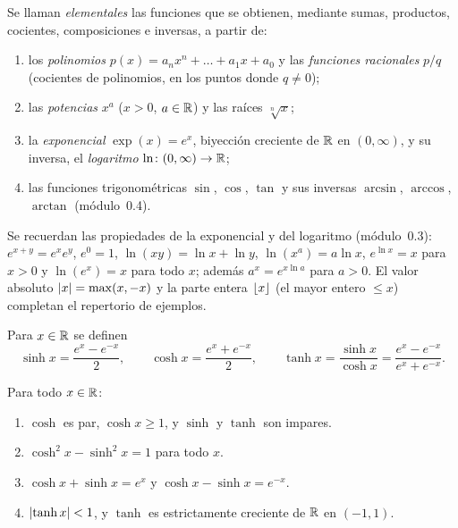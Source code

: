 \begin{definicion}\label{def:elementales}
Se llaman \emph{elementales} las funciones que se obtienen, mediante sumas, productos, cocientes, composiciones e inversas, a partir de:
\begin{enumerate}
  \item los \emph{polinomios} $p(x)=a_nx^{n}+\dots+a_1x+a_0$ y las \emph{funciones racionales} $p/q$ (cocientes de polinomios, en los puntos donde $q\ne0$);
  \item las \emph{potencias} $x^{a}$ ($x>0$, $a\in\mathbb{R}$) y las raíces $\sqrt[n]{x}$;
  \item la \emph{exponencial} $\exp(x)=e^{x}$, biyección creciente de $\mathbb{R}$ en $(0,\infty)$, y su inversa, el \emph{logaritmo} $\ln\colon(0,\infty)\to\mathbb{R}$;
  \item las funciones trigonométricas $\sin$, $\cos$, $\tan$ y sus inversas $\arcsin$, $\arccos$, $\arctan$ (módulo~0.4).
\end{enumerate}
\end{definicion}

Se recuerdan las propiedades de la exponencial y del logaritmo (módulo~0.3): $e^{x+y}=e^{x}e^{y}$, $e^{0}=1$, $\ln(xy)=\ln x+\ln y$, $\ln(x^{a})=a\ln x$, $e^{\ln x}=x$ para $x>0$ y $\ln(e^{x})=x$ para todo $x$; además $a^{x}=e^{x\ln a}$ para $a>0$. El valor absoluto $\lvert x\rvert=\max(x,-x)$ y la parte entera $\lfloor x\rfloor$ (el mayor entero $\le x$) completan el repertorio de ejemplos.

\begin{definicion}\label{def:hiperbolicas}
Para $x\in\mathbb{R}$ se definen
\[
\sinh x=\frac{e^{x}-e^{-x}}{2},\qquad \cosh x=\frac{e^{x}+e^{-x}}{2},\qquad \tanh x=\frac{\sinh x}{\cosh x}=\frac{e^{x}-e^{-x}}{e^{x}+e^{-x}}.
\]
\end{definicion}

\begin{proposicion}\label{prop:hiperbolicas}
Para todo $x\in\mathbb{R}$:
\begin{enumerate}
  \item $\cosh$ es par, $\cosh x\ge1$, y $\sinh$ y $\tanh$ son impares.
  \item $\cosh^{2}x-\sinh^{2}x=1$ para todo $x$.
  \item $\cosh x+\sinh x=e^{x}$ y $\cosh x-\sinh x=e^{-x}$.
  \item $\lvert\tanh x\rvert<1$, y $\tanh$ es estrictamente creciente de $\mathbb{R}$ en $(-1,1)$.
\end{enumerate}
\end{proposicion}

